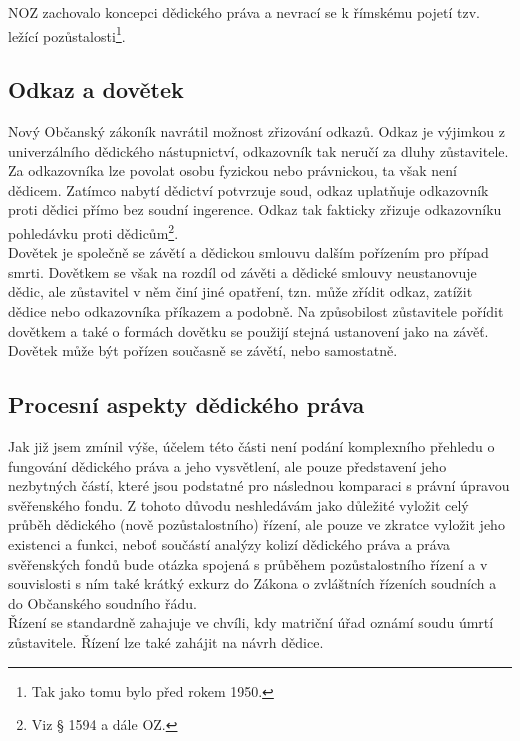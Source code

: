 \documentclass{article}
\begin{document}
NOZ zachovalo koncepci dědického práva a nevrací se k římskému pojetí tzv. ležící pozůstalosti\footnote{Tak jako tomu bylo před rokem 1950.}.

\subsection{Odkaz a dovětek}

Nový Občanský zákoník navrátil možnost zřizování odkazů. Odkaz je výjimkou z univerzálního dědického nástupnictví, odkazovník tak neručí za dluhy zůstavitele. Za odkazovníka lze povolat osobu fyzickou nebo právnickou, ta však není dědicem. Zatímco nabytí dědictví potvrzuje soud, odkaz uplatňuje odkazovník proti dědici přímo bez soudní ingerence. Odkaz tak fakticky zřizuje odkazovníku pohledávku proti dědicům\footnote{Viz § 1594 a dále OZ.}.\\

Dovětek je společně se závětí a dědickou smlouvu dalším pořízením pro případ smrti. Dovětkem se však na rozdíl od závěti a dědické smlouvy neustanovuje dědic, ale zůstavitel v něm činí jiné opatření, tzn. může zřídit odkaz, zatížit dědice nebo odkazovníka příkazem a podobně. Na způsobilost zůstavitele pořídit dovětkem a také o formách dovětku se použijí stejná ustanovení jako na závěť. Dovětek může být pořízen současně se závětí, nebo samostatně.\\

\subsection{Procesní aspekty dědického práva}

Jak již jsem zmínil výše, účelem této části není podání komplexního přehledu o fungování dědického práva a jeho vysvětlení, ale pouze představení jeho nezbytných částí, které jsou podstatné pro následnou komparaci s právní úpravou svěřenského fondu. Z tohoto důvodu neshledávám jako důležité vyložit celý průběh dědického (nově pozůstalostního) řízení, ale pouze ve zkratce vyložit jeho existenci a funkci, neboť součástí analýzy kolizí dědického práva a práva svěřenských fondů bude otázka spojená s průběhem pozůstalostního řízení a v souvislosti s ním také krátký exkurz do Zákona o zvláštních řízeních soudních a do Občanského soudního řádu.\\

Řízení se standardně zahajuje ve chvíli, kdy matriční úřad oznámí soudu úmrtí zůstavitele. Řízení lze také zahájit na návrh dědice.\\
\end{document}

